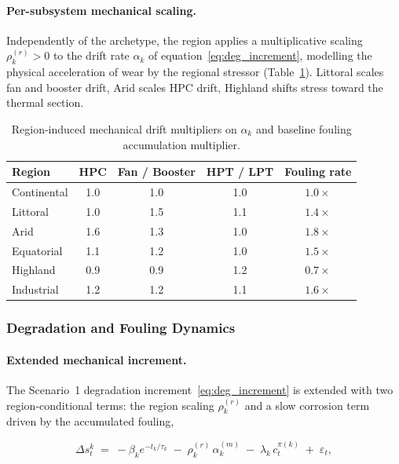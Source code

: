 \paragraph{Per-subsystem mechanical scaling.}
Independently of the archetype, the region applies a multiplicative
scaling $\rho^{(r)}_k > 0$ to the drift rate $\alpha_k$ of
equation~\eqref{eq:deg_increment}, modelling the physical acceleration
of wear by the regional stressor (Table~\ref{tab:region_scaling}).
Littoral scales fan and booster drift, Arid scales HPC drift,
Highland shifts stress toward the thermal section.

\begin{table}[h]
\centering
\caption{Region-induced mechanical drift multipliers on $\alpha_k$ and
baseline fouling accumulation multiplier.}
\label{tab:region_scaling}
\small
\begin{tabular}{lcccc}
\toprule
Region & HPC & Fan / Booster & HPT / LPT & Fouling rate \\
\midrule
Continental & 1.0 & 1.0 & 1.0 & $1.0\times$ \\
Littoral    & 1.0 & 1.5 & 1.1 & $1.4\times$ \\
Arid        & 1.6 & 1.3 & 1.0 & $1.8\times$ \\
Equatorial  & 1.1 & 1.2 & 1.0 & $1.5\times$ \\
Highland    & 0.9 & 0.9 & 1.2 & $0.7\times$ \\
Industrial  & 1.2 & 1.2 & 1.1 & $1.6\times$ \\
\bottomrule
\end{tabular}
\end{table}

\subsubsection{Degradation and Fouling Dynamics}
\label{sec:scen4_degradation}

\paragraph{Extended mechanical increment.}
The Scenario~1 degradation increment~\eqref{eq:deg_increment} is
extended with two region-conditional terms: the region scaling
$\rho^{(r)}_k$ and a slow corrosion term driven by the accumulated
fouling,

\begin{equation}
  \Delta s^k_t \;=\; -\beta_k e^{-t_k/\tau_k}
                  \;-\; \rho^{(r)}_k\,\alpha^{(m)}_k
                  \;-\; \lambda_k\, c^{\pi(k)}_t
                  \;+\; \varepsilon_t,
  \label{eq:scen4_deg_increment}
\end{equation}

